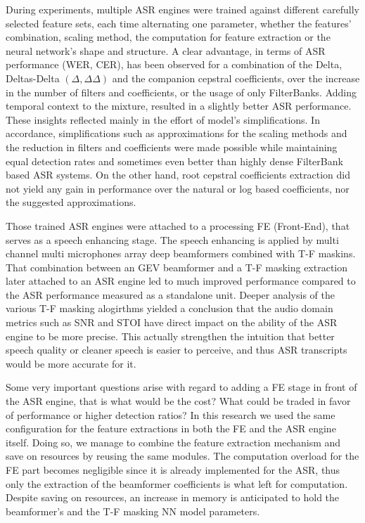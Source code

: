 During experiments,
multiple ASR engines were trained against
different carefully selected feature sets,
each time alternating one parameter,
whether the features' combination,
scaling method, the computation for feature extraction
or the neural network's shape and structure.
A clear advantage, 
in terms of ASR performance (WER, CER), 
has been observed for a combination of the
Delta, Deltas-Delta \((\Delta, \Delta\Delta)\) 
and the companion
cepstral coefficients, over the increase in the
number of filters and coefficients, 
or the usage of only FilterBanks.
Adding temporal context to the mixture,
resulted in a slightly better ASR performance.
These insights reflected mainly in 
the effort of model's simplifications.
In accordance, simplifications such as
approximations for the scaling methods
and the reduction in filters and coefficients
were made possible while maintaining
equal detection rates and sometimes
even better than highly dense
FilterBank based ASR systems.
On the other hand, root cepstral coefficients
extraction did not yield any gain in performance
over the natural or log based coefficients, nor
the suggested approximations.

\bigskip

Those trained ASR engines were attached to
a processing FE (Front-End), that serves as
a speech enhancing stage. The speech enhancing
is applied by multi channel multi microphones array
deep beamformers combined with T-F maskins.
That combination between an GEV beamformer 
and a T-F masking extraction later attached to
an ASR engine led to much improved
performance compared to the ASR performance
measured as a standalone unit.
Deeper analysis of the various T-F masking alogirthms
yielded a conclusion that the audio domain metrics
such as SNR and STOI have direct impact on 
the ability of the ASR engine to be more precise.
This actually strengthen the intuition that 
better speech quality or cleaner speech
is easier to perceive, and thus 
ASR transcripts would be more accurate for it.

\bigskip

Some very important questions arise with regard to 
adding a FE stage in front of the ASR engine,
that is what would be the cost? What could be traded
in favor of performance or higher detection ratios?
In this research we used the same configuration
for the feature extractions in both the
FE and the ASR engine itself. 
Doing so, we manage to combine the feature extraction
mechanism and save on resources by reusing
the same modules. The computation overload
for the FE part becomes negligible since it is 
already implemented for the ASR, thus
only the extraction of the beamformer coefficients is
what left for computation. Despite saving on resources,
an increase in memory is anticipated to hold
the beamformer's and the T-F masking NN model parameters.

